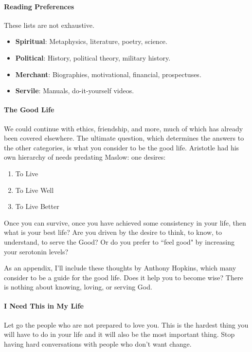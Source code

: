 \paragraph{Reading Preferences}
These lists are not exhaustive.

\begin{itemize}
\item \textbf{Spiritual}: Metaphysics, literature, poetry, science. 
\item \textbf{Political}: History, political theory, military history. 
\item \textbf{Merchant}: Biographies, motivational, financial, prospectuses. 
\item \textbf{Servile}: Manuals, do-it-yourself videos. 
\end{itemize}
\paragraph{The Good Life}
We could continue with ethics, friendship, and more, much of which has already been covered elsewhere. The ultimate question, which determines the answers to the other categories, is what you consider to be the good life. Aristotle had his own hierarchy of needs predating Maslow: one desires:

\begin{enumerate}
\item To Live 
\item To Live Well 
\item To Live Better 
\end{enumerate}
Once you can survive, once you have achieved some consistency in your life, then what is your best life? Are you driven by the desire to think, to know, to understand, to serve the Good? Or do you prefer to ``feel good" by increasing your serotonin levels?

As an appendix, I'll include these thoughts by Anthony Hopkins, which many consider to be a guide for the good life. Does it help you to become wise? There is nothing about knowing, loving, or serving God.

\paragraph{I Need This in My Life}
Let go the people who are not prepared to love you. This is the hardest thing you will have to do in your life and it will also be the most important thing. Stop having hard conversations with people who don't want change.


